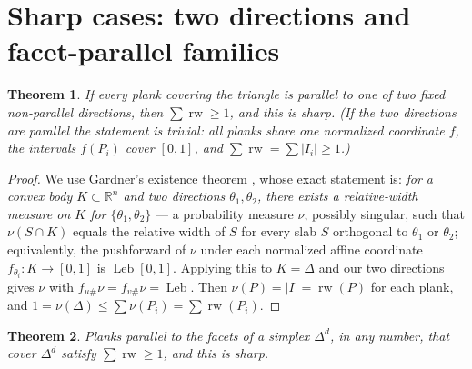 \documentclass[11pt,reqno]{amsart}
\theoremstyle{plain}
\newtheorem{theorem}{Theorem}[section]
\theoremstyle{definition}
\theoremstyle{remark}
\newcommand{\rw}{\operatorname{rw}}
\newcommand{\Leb}{\operatorname{Leb}}
\newcommand{\R}{\mathbb{R}}
\begin{document}
\section{Sharp cases: two directions and facet-parallel families}\label{sec:sharp}
\begin{theorem}\label{thm:twodir}
If every plank covering the triangle is parallel to one of two fixed
\emph{non-parallel} directions, then $\sum\rw\ge1$, and this is sharp. (If the two
directions are parallel the statement is trivial: all planks share one normalized
coordinate $f$, the intervals $f(P_i)$ cover $[0,1]$, and $\sum\rw=\sum|I_i|\ge1$.)
\end{theorem}
\begin{proof}
We use Gardner's existence theorem \cite[Theorem~1]{Gardner88}, whose exact
statement is: \emph{for a convex body $K\subset\R^n$ and two directions
$\theta_1,\theta_2$, there exists a relative-width measure on $K$ for
$\{\theta_1,\theta_2\}$} --- a probability measure $\nu$, possibly singular,
such that $\nu(S\cap K)$ equals the relative width of $S$ for every slab $S$
orthogonal to $\theta_1$ or $\theta_2$; equivalently, the pushforward of $\nu$
under each normalized affine coordinate $f_{\theta_i}:K\to[0,1]$ is
$\Leb[0,1]$. Applying this to $K=\Delta$ and our two directions gives $\nu$
with $f_{u\#}\nu=f_{v\#}\nu=\Leb$. Then $\nu(P)=|I|=\rw(P)$ for each plank, and
$1=\nu(\Delta)\le\sum\nu(P_i)=\sum\rw(P_i)$.
\end{proof}
\begin{theorem}\label{thm:facet}
Planks parallel to the facets of a simplex $\Delta^d$, in any number, that cover
$\Delta^d$ satisfy $\sum\rw\ge1$, and this is sharp.
\end{theorem}
\end{document}

